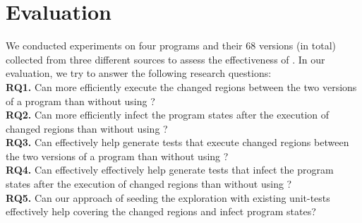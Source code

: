 \section{Evaluation}
\label{sec:evaluation}

We conducted experiments on four programs and their 68 versions (in total) collected from three different sources to assess the effectiveness of . In our evaluation, we try to answer the following research questions:
\\ \textbf{RQ1.} Can  more efficiently execute the changed regions between the two versions of a program than without using ?
	\\ \textbf{RQ2.} Can  more efficiently infect the program states after the execution of changed regions than without using ?	
	\\ \textbf{RQ3.} Can  effectively help generate tests that execute changed regions between the two versions of a program than without using ?
	\\ \textbf{RQ4.} Can  effectively effectively help generate tests that infect the program states after the execution of changed regions than without using ?
	\\ \textbf{RQ5.} Can our approach of seeding the exploration with existing unit-tests effectively help covering the changed regions and infect program states?

